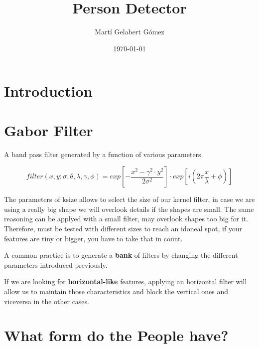 \documentclass[11pt,twoside,a4paper]{article}
\title{Person Detector}
\author{Martí Gelabert Gómez}
\date{\today}
\begin{document}
\maketitle

\section{Introduction}


\section{Gabor Filter}



A band pass filter generated by a function of various parameters.

\begin{equation}
    filter(x,y;\sigma,\theta,\lambda,\gamma,\phi) = exp [ - \frac{x^2 - \gamma ^2 \cdot y^2}{2 \sigma^2} ] \cdot exp [ i (2 \pi \frac{x}{\lambda} + \phi) ] 
\end{equation}



The parameters of ksize allows to select the size of our kernel filter, in case we are using a really big shape we will overlook details if the shapes are small. The same reasoning can be applyed with a small filter, may overlook shapes too big for it. Therefore, must be tested with different sizes to reach an idoneal spot, if your features are tiny or bigger, you have to take that in count.

A common practice is to generate a \textbf{bank}  of filters by changing the different parameters introduced previously.

If we are looking for \textbf{horizontal-like} features, applying an horizontal filter will allow us to maintain those characteristics and block the vertical ones and viceversa in the other cases.

\section{What form do the People have?}
\end{document}
